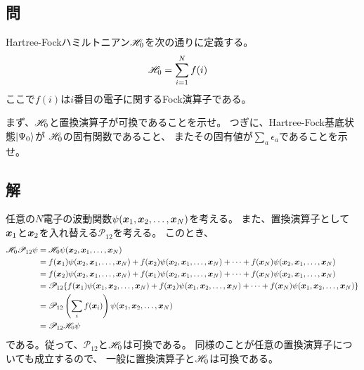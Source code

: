 \subsection{問}
Hartree-Fockハミルトニアン${\mathscr{H}}_0$を次の通りに定義する。
\begin{align}
	{\ensuremath{\mathscr{H}}}_0
&=
	\sum_{i=1}^{N}
		f(i)
\end{align}
ここで$f(i)$は$i$番目の電子に関するFock演算子である。

まず、${\mathscr{H}}_0$と置換演算子が可換であることを示せ。
つぎに、Hartree-Fock基底状態$\ket{\Psi_0}$が
${\mathscr{H}}_0$の固有関数であること、
またその固有値が$\sum_a \epsilon_a$であることを示せ。


\subsection{解}
任意の$N$電子の波動関数$\psi({\bm{x}}_1,{\bm{x}}_2,\dots,{\bm{x}}_N)$を考える。
また、置換演算子として${\bm{x}}_1$と${\bm{x}}_2$を入れ替える$\mathscr{P}_{12}$を考える。
このとき、
\begin{align}
	\H_0
	\mathscr{P}_{12}
		\psi
&=
	\H_0
		\psi(\x_2,\x_1,\dots,\x_N) \\
%
%
&=
	f(\x_1)
		\psi(\x_2,\x_1,\dots,\x_N)
	+
	f(\x_2)
		\psi(\x_2,\x_1,\dots,\x_N)
	+
	\dots
	+
	f(\x_N)
		\psi(\x_2,\x_1,\dots,\x_N) \\
%
%
&=
	f(\x_2)
		\psi(\x_2,\x_1,\dots,\x_N)
	+
	f(\x_1)
		\psi(\x_2,\x_1,\dots,\x_N)
	+
	\dots
	+
	f(\x_N)
		\psi(\x_2,\x_1,\dots,\x_N) \\
%
%
&=
	\mathscr{P}_{12}\{
		f(\x_1)
			\psi(\x_1,\x_2,\dots,\x_N)
		+
		f(\x_2)
			\psi(\x_1,\x_2,\dots,\x_N)
		+
		\dots
		+
		f(\x_N)
			\psi(\x_1,\x_2,\dots,\x_N)
	\} \\
%
%
&=
	\mathscr{P}_{12}
	\left(
		\sum_{i} f(\x_i)
	\right)
		\psi(\x_1,\x_2,\dots,\x_N) \\
%
%
&=
	\mathscr{P}_{12}
	\H_0
		\psi
\end{align}
である。従って、$\mathscr{P}_{12}$と${\mathscr{H}}_0$は可換である。
同様のことが任意の置換演算子についても成立するので、
一般に置換演算子と${\mathscr{H}}_0$は可換である。

